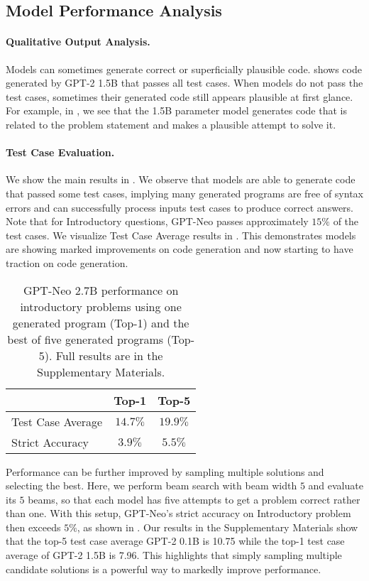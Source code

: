 \documentclass{article}
\begin{document}
\subsection{Model Performance Analysis}

\paragraph{Qualitative Output Analysis.} Models can sometimes generate correct or superficially plausible code.  shows code generated by GPT-2 1.5B that passes all test cases. When models do not pass the test cases, sometimes their generated code still appears plausible at first glance. For example, in , we see that the 1.5B parameter model generates code that is related to the problem statement and makes a plausible attempt to solve it.


\paragraph{Test Case Evaluation.}
We show the main results in . We observe that models are able to generate code that passed some test cases, implying many generated programs are free of syntax errors and can successfully process inputs test cases to produce correct answers. Note that for Introductory questions, GPT-Neo passes approximately $15\%$ of the test cases. We visualize Test Case Average results in . This demonstrates models are showing marked improvements on code generation and now starting to have traction on code generation.

\begin{wraptable}{r}{0.43\textwidth}
\begin{center}
\begin{tabular}{l|cc}
    & Top-1 & Top-5 \\ \midrule
Test Case Average & $14.7\%$ & $19.9\%$ \\
Strict Accuracy & $3.9\%$ & $5.5\%$ \\
\bottomrule
\end{tabular}
\caption{GPT-Neo 2.7B performance on introductory problems using one generated program (Top-1) and the best of five generated programs (Top-5). Full results are in the Supplementary Materials. }
\label{tab:topk}
\end{center}
\end{wraptable}

Performance can be further improved by sampling multiple solutions and selecting the best. Here, we perform beam search with beam width $5$ and evaluate its $5$ beams, so that each model has five attempts to get a problem correct rather than one. With this setup, GPT-Neo's strict accuracy on Introductory problem then exceeds $5\%$, as shown in . Our results in the Supplementary Materials show that the top-5 test case average GPT-2 0.1B is 10.75 while the top-1 test case average of GPT-2 1.5B is 7.96. This highlights that simply sampling multiple candidate solutions is a powerful way to markedly improve performance.
\end{document}
